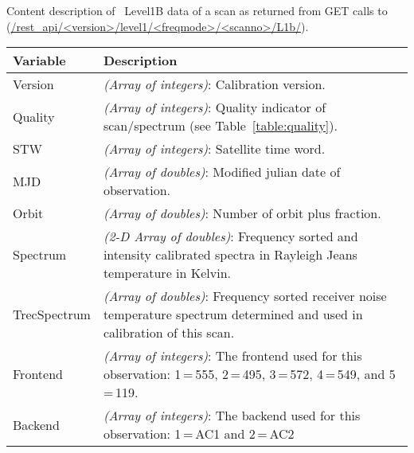 \begin{table}
\caption{ Content description of \smr\ Level1B data of a scan as returned from GET calls to
(\url{/rest_api/<version>/level1/<freqmode>/<scanno>/L1b/}).
}
\label{table:dataformat}
\end{table}
\addtocounter{table}{-1}
\begin{longtable}{| p{} | p{} |} 
\hline
  \textbf{Variable} & \textbf{Description} \\
  \hline
     Version         & \emph{(Array of integers)}: Calibration version. \\ \hline
     Quality         & \emph{(Array of integers)}: Quality indicator of scan/spectrum (see Table~\ref{table:quality}). \\ \hline
     STW             & \emph{(Array of integers)}: Satellite time word.\\ \hline
     MJD             & \emph{(Array of doubles)}: Modified julian date of observation. \\ \hline
     Orbit           & \emph{(Array of doubles)}: Number of orbit plus fraction. \\ \hline
     Spectrum        & \emph{(2-D Array of doubles)}: Frequency sorted and intensity calibrated spectra
                       in Rayleigh Jeans temperature in Kelvin.\\ \hline
     TrecSpectrum    & \emph{(Array of doubles)}: Frequency sorted receiver noise temperature spectrum
                       determined and used in calibration of this scan. \\ \hline
     Frontend        & \emph{(Array of integers)}: The frontend used for this observation: 1\,=\,555, 2\,=\,495, 
                       3\,=\,572, 4\,=\,549, and 5\,=\,119.\\ \hline
     Backend         & \emph{(Array of integers)}: The backend used for this observation: 1\,=\,AC1 and 2\,=\,AC2\\ \hline

\end{longtable}
